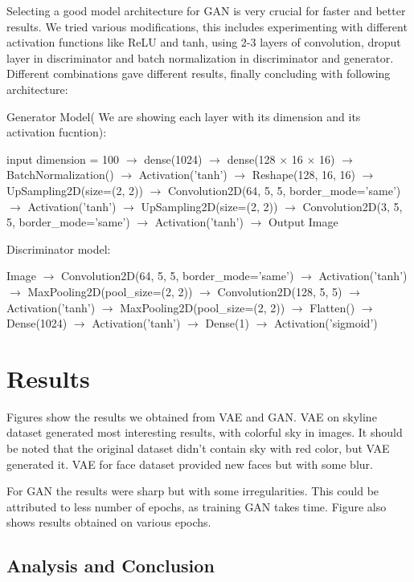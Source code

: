 \documentclass{article} %
\begin{document}
    Selecting a good model architecture for GAN is very crucial for faster and better results. We tried various modifications, this includes experimenting with different activation functions like ReLU and tanh, using 2-3 layers of convolution, droput layer in discriminator and batch normalization in discriminator and generator. Different combinations gave different results, finally concluding with following architecture:

    Generator Model( We are showing each layer with its dimension and its activation fucntion):

        input dimension = 100 $\rightarrow$ dense(1024) $\rightarrow$ dense(128 $\times$ 16 $\times$ 16) $\rightarrow$ 
        BatchNormalization() $\rightarrow$ Activation('tanh') $\rightarrow$ Reshape(128, 16, 16) $\rightarrow$ UpSampling2D(size=(2, 2)) $\rightarrow$
        Convolution2D(64, 5, 5, border\_mode='same') $\rightarrow$
        Activation('tanh') $\rightarrow$
        UpSampling2D(size=(2, 2)) $\rightarrow$ 
        Convolution2D(3, 5, 5, border\_mode='same') $\rightarrow$
        Activation('tanh') $\rightarrow$
        Output Image
    
Discriminator model:

        Image $\rightarrow$
 Convolution2D(64, 5, 5, border\_mode='same') $\rightarrow$
 Activation('tanh') $\rightarrow$
 MaxPooling2D(pool\_size=(2, 2)) $\rightarrow$
 Convolution2D(128, 5, 5) $\rightarrow$
 Activation('tanh') $\rightarrow$
 MaxPooling2D(pool\_size=(2, 2)) $\rightarrow$
 Flatten() $\rightarrow$
 Dense(1024) $\rightarrow$
 Activation('tanh') $\rightarrow$
 Dense(1) $\rightarrow$
 Activation('sigmoid')

\section{Results}
Figures show the results we obtained from VAE and GAN. VAE on skyline dataset generated most interesting results, with colorful sky in images. It should be noted that the original dataset didn't contain sky with red color, but VAE generated it. VAE for face dataset provided new faces but with some blur.

      For GAN the results were sharp but with some irregularities. This could be attributed to less number of epochs, as training GAN takes time. Figure also shows results obtained on various epochs.
      \subsection{Analysis and Conclusion}
\end{document}
